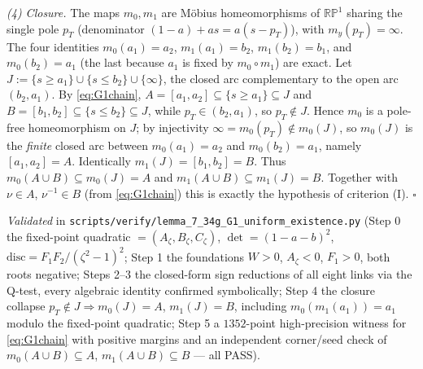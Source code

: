 \documentclass[
]{article}
\begin{document}
\emph{(4) Closure.} The maps $m_0,m_1$ are M\"obius homeomorphisms of
$\mathbb{RP}^1$ sharing the single pole $p_T$ (denominator $(1-a)+as=a(s-p_T)$),
with $m_y(p_T)=\infty$. The four identities $m_0(a_1)=a_2$, $m_1(a_1)=b_2$,
$m_1(b_2)=b_1$, and $m_0(b_2)=a_1$ (the last because $a_1$ is fixed by
$m_0\circ m_1$) are exact. Let $J:=\{s\ge a_1\}\cup\{s\le b_2\}\cup\{\infty\}$,
the closed arc complementary to the open arc $(b_2,a_1)$. By \eqref{eq:G1chain},
$A=[a_1,a_2]\subseteq\{s\ge a_1\}\subseteq J$ and $B=[b_1,b_2]\subseteq\{s\le
b_2\}\subseteq J$, while $p_T\in(b_2,a_1)$, so $p_T\notin J$. Hence $m_0$ is a
pole-free homeomorphism on $J$; by injectivity $\infty=m_0(p_T)\notin m_0(J)$,
so $m_0(J)$ is the \emph{finite} closed arc between $m_0(a_1)=a_2$ and
$m_0(b_2)=a_1$, namely $[a_1,a_2]=A$. Identically $m_1(J)=[b_1,b_2]=B$. Thus
$m_0(A\cup B)\subseteq m_0(J)=A$ and $m_1(A\cup B)\subseteq m_1(J)=B$. Together
with $\nu\in A$, $\nu^{-1}\in B$ (from \eqref{eq:G1chain}) this is exactly the
hypothesis of criterion {\rm(I)}. \hfill$\square$

\emph{Validated} in
\texttt{scripts/verify/lemma\_7\_34g\_G1\_uniform\_existence.py} (Step 0 the
fixed-point quadratic $=(A_\zeta,B_\zeta,C_\zeta)$, $\det=(1-a-b)^2$,
$\mathrm{disc}=F_1F_2/(\zeta^2-1)^2$; Step 1 the foundations $W>0$, $A_\zeta<0$,
$F_1>0$, both roots negative; Steps 2--3 the closed-form sign reductions of all
eight links via the Q-test, every algebraic identity confirmed symbolically;
Step 4 the closure collapse $p_T\notin J\Rightarrow m_0(J)=A$, $m_1(J)=B$,
including $m_0(m_1(a_1))=a_1$ modulo the fixed-point quadratic; Step 5 a
$1352$-point high-precision witness for \eqref{eq:G1chain} with positive margins
and an independent corner/seed check of $m_0(A\cup B)\subseteq A$,
$m_1(A\cup B)\subseteq B$ --- all PASS).
\end{document}
